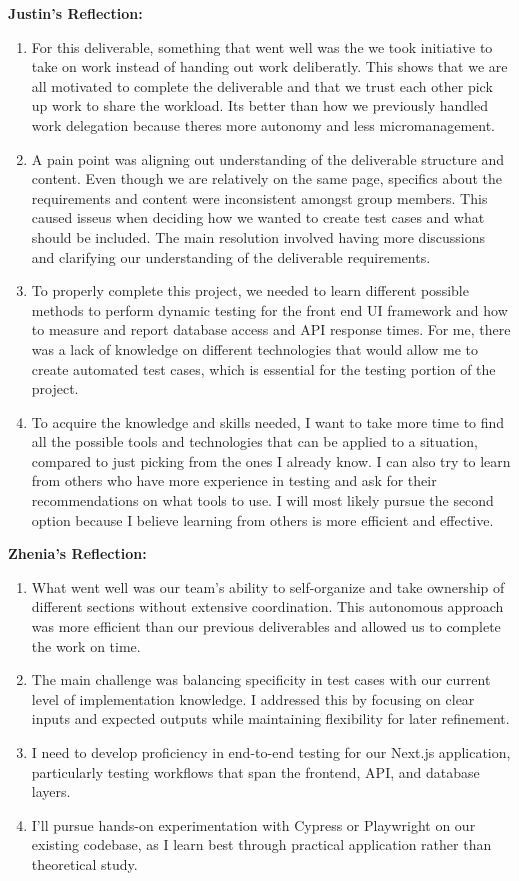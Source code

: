 \documentclass[12pt, titlepage]{article}
\begin{document}
\noindent\textbf{Justin's Reflection:}
\begin{enumerate}
  \item For this deliverable, something that went well was the we took initiative to take on work instead of handing out work deliberatly.
  This shows that we are all motivated to complete the deliverable and that we trust each other pick up work to share the workload. Its better than 
  how we previously handled work delegation because theres more autonomy and less micromanagement.
  \item A pain point was aligning out understanding of the deliverable structure and content. Even though we are relatively on the same page, specifics about the 
  requirements and content were inconsistent amongst group members. This caused isseus when deciding how we wanted to create test cases and what should be included. The main resolution
  involved having more discussions and clarifying our understanding of the deliverable requirements.
  \item To properly complete this project, we needed to learn different possible methods to perform dynamic testing for the front end UI framework and how to measure and report database access and API 
  response times. For me, there was a lack of knowledge on different technologies that would allow me to create automated test cases, which is essential for the testing portion of the project.
  \item To acquire the knowledge and skills needed, I want to take more time to find all the possible tools and technologies that can be applied to a situation, compared to just picking from the ones I already know.
  I can also try to learn from others who have more experience in testing and ask for their recommendations on what tools to use. I will most likely pursue the second option because I believe learning from others is more efficient and effective.
\end{enumerate}

\noindent\textbf{Zhenia's Reflection:}
\begin{enumerate}
  \item What went well was our team's ability to self-organize and take ownership of different sections without extensive coordination. This autonomous approach was more efficient than our previous deliverables and allowed us to complete the work on time.
  \item The main challenge was balancing specificity in test cases with our current level of implementation knowledge. I addressed this by focusing on clear inputs and expected outputs while maintaining flexibility for later refinement.
  \item I need to develop proficiency in end-to-end testing for our Next.js application, particularly testing workflows that span the frontend, API, and database layers.
  \item I'll pursue hands-on experimentation with Cypress or Playwright on our existing codebase, as I learn best through practical application rather than theoretical study.
\end{enumerate}
\end{document}
